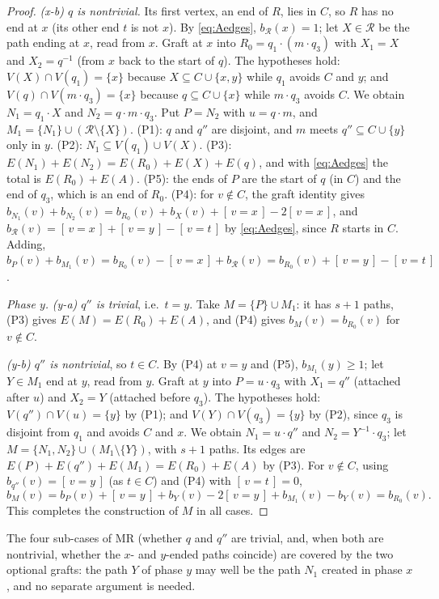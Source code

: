 \documentclass[11pt]{amsart}
\theoremstyle{definition}
\theoremstyle{remark}
\renewcommand{\_}{\oldunderscore\allowbreak}
\newcommand{\ind}[1]{[\,#1\,]}
\begin{document}
\begin{proof}
\emph{(x-b) $q$ is nontrivial.} Its first vertex, an end of $R$, lies in $C$, so $R$ has no end at
$x$ (its other end $t$ is not $x$). By \eqref{eq:Aedges}, $b_{\mathcal R}(x)=1$; let $X\in\mathcal R$
be the path ending at $x$, read from $x$. Graft at $x$ into $R_0=q_1\cdot(m\cdot q_3)$ with $X_1=X$
and $X_2=q^{-1}$ (from $x$ back to the start of $q$). The hypotheses hold: $V(X)\cap V(q_1)=\{x\}$
because $X\subseteq C\cup\{x,y\}$ while $q_1$ avoids $C$ and $y$; and $V(q)\cap V(m\cdot
q_3)=\{x\}$ because $q\subseteq C\cup\{x\}$ while $m\cdot q_3$ avoids $C$. We obtain $N_1=q_1\cdot X$
and $N_2=q\cdot m\cdot q_3$. Put $P=N_2$ with $u=q\cdot m$, and $M_1=\{N_1\}\cup(\mathcal
R\setminus\{X\})$. (P1): $q$ and $q''$ are disjoint, and $m$ meets $q''\subseteq C\cup\{y\}$ only
in $y$. (P2): $N_1\subseteq V(q_1)\cup V(X)$. (P3): $E(N_1)+E(N_2)=E(R_0)+E(X)+E(q)$, and with
\eqref{eq:Aedges} the total is $E(R_0)+E(A)$. (P5): the ends of $P$ are the start of $q$ (in $C$)
and the end of $q_3$, which is an end of $R_0$. (P4): for $v\notin C$, the graft identity gives
$b_{N_1}(v)+b_{N_2}(v)=b_{R_0}(v)+b_X(v)+\ind{v=x}-2\ind{v=x}$, and
$b_{\mathcal R}(v)=\ind{v=x}+\ind{v=y}-\ind{v=t}$ by \eqref{eq:Aedges}, since $R$ starts in $C$. Adding,
$b_P(v)+b_{M_1}(v)=b_{R_0}(v)-\ind{v=x}+b_{\mathcal R}(v)=b_{R_0}(v)+\ind{v=y}-\ind{v=t}$.

\emph{Phase $y$.}
\emph{(y-a) $q''$ is trivial}, i.e.\ $t=y$. Take $M=\{P\}\cup M_1$: it has $s+1$ paths, (P3) gives
$E(M)=E(R_0)+E(A)$, and (P4) gives $b_M(v)=b_{R_0}(v)$ for $v\notin C$.

\emph{(y-b) $q''$ is nontrivial}, so $t\in C$. By (P4) at $v=y$ and (P5), $b_{M_1}(y)\ge1$; let
$Y\in M_1$ end at $y$, read from $y$. Graft at $y$ into $P=u\cdot q_3$ with $X_1=q''$ (attached after
$u$) and $X_2=Y$ (attached before $q_3$). The hypotheses hold: $V(q'')\cap V(u)=\{y\}$ by (P1); and
$V(Y)\cap V(q_3)=\{y\}$ by (P2), since $q_3$ is disjoint from $q_1$ and avoids $C$ and $x$. We obtain
$N_1=u\cdot q''$ and $N_2=Y^{-1}\cdot q_3$; let $M=\{N_1,N_2\}\cup(M_1\setminus\{Y\})$, with $s+1$
paths. Its edges are $E(P)+E(q'')+E(M_1)=E(R_0)+E(A)$ by (P3). For $v\notin C$, using
$b_{q''}(v)=\ind{v=y}$ (as $t\in C$) and (P4) with $\ind{v=t}=0$,
\[
b_M(v)=b_P(v)+\ind{v=y}+b_Y(v)-2\ind{v=y}+b_{M_1}(v)-b_Y(v)=b_{R_0}(v).
\]
This completes the construction of $M$ in all cases.
\end{proof}

The four sub-cases of MR (whether $q$ and $q''$ are trivial, and, when both are nontrivial, whether
the $x$- and $y$-ended paths coincide) are covered by the two optional grafts: the path $Y$ of phase
$y$ may well be the path $N_1$ created in phase $x$, and no separate argument is needed.
\end{document}

